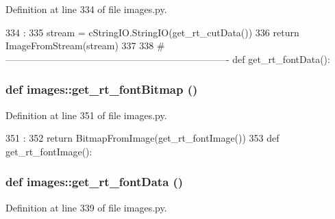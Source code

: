 Definition at line 334 of file images.py.


\begin{DoxyCode}
334                      :
335     stream = cStringIO.StringIO(get_rt_cutData())
336     return ImageFromStream(stream)
337 
338 #----------------------------------------------------------------------
def get_rt_fontData():
\end{DoxyCode}
\hypertarget{namespaceimages_a2e33141030dbc25e0b8512dba08e69c6}{
\subsubsection[{get\_\-rt\_\-fontBitmap}]{\setlength{\rightskip}{0pt plus 5cm}def images::get\_\-rt\_\-fontBitmap ()}}
\label{namespaceimages_a2e33141030dbc25e0b8512dba08e69c6}


Definition at line 351 of file images.py.


\begin{DoxyCode}
351                        :
352     return BitmapFromImage(get_rt_fontImage())
353 
def get_rt_fontImage():
\end{DoxyCode}
\hypertarget{namespaceimages_a48b71c466c680ad944a8b7c3ee229cf5}{
\subsubsection[{get\_\-rt\_\-fontData}]{\setlength{\rightskip}{0pt plus 5cm}def images::get\_\-rt\_\-fontData ()}}
\label{namespaceimages_a48b71c466c680ad944a8b7c3ee229cf5}


Definition at line 339 of file images.py.


